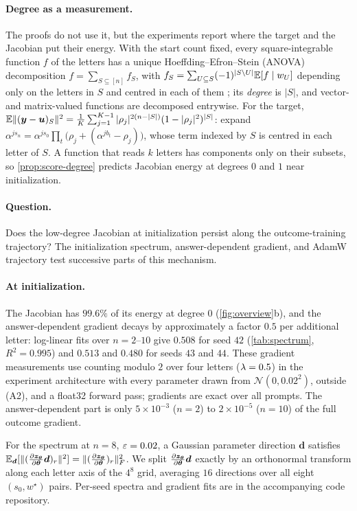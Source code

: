 \paragraph{Degree as a measurement.} The proofs do not use it, but the experiments report where the target and the Jacobian put their
energy. With the start count fixed, every square-integrable function $f$ of the letters has a unique Hoeffding--Efron--Stein (ANOVA)
decomposition $f=\sum_{S\subseteq[n]}f_S$, with $f_S=\sum_{U\subseteq S}(-1)^{|S\setminus U|}\mathbb E[f\mid w_U]$ depending only on the letters in $S$ and centred in each
of them \citep{hoeffding1948class,efron1981jackknife,odonnell2014analysis}; its \emph{degree} is $|S|$, and vector- and matrix-valued functions are
decomposed entrywise. For the target, $\mathbb E\|(\bm y-\bm u)_S\|^2=\frac{1}{K}\sum_{j=1}^{K-1}|\rho_j|^{2(n-|S|)}(1-|\rho_j|^2)^{|S|}$: expand
$\alpha^{js_n}=\alpha^{js_0}\prod_t\bigl(\rho_j+(\alpha^{jb_t}-\rho_j)\bigr)$, whose term indexed by $S$ is centred in each letter of $S$. A function that reads $k$ letters
has components only on their subsets, so \cref{prop:score-degree} predicts Jacobian energy at degrees $0$ and $1$ near initialization.

\paragraph{Question.} Does the low-degree Jacobian at initialization persist along the outcome-training trajectory?
The initialization spectrum, answer-dependent gradient, and AdamW trajectory test successive parts of this mechanism.

\paragraph{At initialization.} The Jacobian has $99.6\%$ of its energy at degree $0$ (\cref{fig:overview}b), and the answer-dependent
gradient decays by approximately a factor $0.5$ per additional letter: log-linear fits over $n=2$--$10$ give $0.508$ for seed $42$
(\cref{tab:spectrum}, $R^2=0.995$) and $0.513$ and $0.480$ for seeds $43$ and $44$. These gradient measurements use
counting modulo $2$ over four letters ($\lambda=0.5$) in the experiment architecture with every parameter drawn from
$\mathcal N(0,0.02^2)$, outside (A2), and a float32 forward pass; gradients are exact over all prompts. The answer-dependent part is only
$5\times10^{-3}$ ($n=2$) to $2\times10^{-5}$ ($n=10$) of the full outcome gradient.

For the spectrum at $n=8$, $\varepsilon=0.02$, a Gaussian parameter direction $\bm d$ satisfies
$\E_{\bm d}[\|(\Jz\bm d)_r\|^2]=\|(\Jz)_r\|_F^2$.
We split $\Jz\bm d$ exactly by an orthonormal transform along each letter axis of the $4^8$ grid,
averaging $16$ directions over all eight $(s_0,w^\star)$ pairs. Per-seed spectra and gradient fits are in the accompanying code repository.

